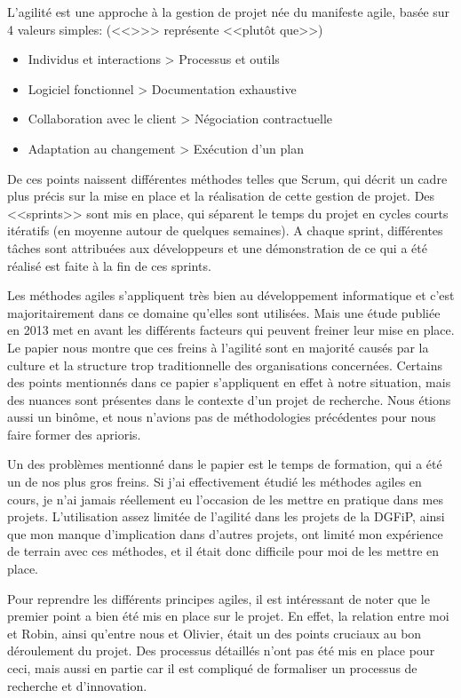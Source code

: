 \documentclass[openany, 11pt]{memoir}
\begin{document}
L'agilité est une approche à la gestion de projet née du manifeste agile, basée sur 4 valeurs simples: (<<{>}>> représente <<plutôt que>>)

\begin{itemize}
	\item Individus et interactions > Processus et outils
	\item Logiciel fonctionnel > Documentation exhaustive
	\item Collaboration avec le client > Négociation contractuelle
	\item Adaptation au changement > Exécution d'un plan
\end{itemize}

De ces points naissent différentes méthodes telles que Scrum, qui décrit un cadre plus précis sur la mise en place et la réalisation de cette gestion de projet. Des <<sprints>> sont mis en place, qui séparent le temps du projet en cycles courts itératifs (en moyenne autour de quelques semaines). A chaque sprint, différentes tâches sont attribuées aux développeurs et une démonstration de ce qui a été réalisé est faite à la fin de ces sprints.

\bigskip
Les méthodes agiles s'appliquent très bien au développement informatique et c'est majoritairement dans ce domaine qu'elles sont utilisées. Mais une étude publiée en 2013 \cite{obstacles} met en avant les différents facteurs qui peuvent freiner leur mise en place. Le papier nous montre que ces freins à l'agilité sont en majorité causés par la culture et la structure trop traditionnelle des organisations concernées. Certains des points mentionnés dans ce papier s'appliquent en effet à notre situation, mais des nuances sont présentes dans le contexte d'un projet de recherche. Nous étions aussi un binôme, et nous n'avions pas de méthodologies précédentes pour nous faire former des aprioris.

Un des problèmes mentionné dans le papier est le temps de formation, qui a été un de nos plus gros freins. Si j'ai effectivement étudié les méthodes agiles en cours, je n'ai jamais réellement eu l'occasion de les mettre en pratique dans mes projets. L'utilisation assez limitée de l'agilité dans les projets de la \gls{DGFiP}, ainsi que mon manque d'implication dans d'autres projets, ont limité mon expérience de terrain avec ces méthodes, et il était donc difficile pour moi de les mettre en place.

\bigskip
Pour reprendre les différents principes agiles, il est intéressant de noter que le premier point a bien été mis en place sur le projet. En effet, la relation entre moi et Robin, ainsi qu'entre nous et Olivier, était un des points cruciaux au bon déroulement du projet. Des processus détaillés n'ont pas été mis en place pour ceci, mais aussi en partie car il est compliqué de formaliser un processus de recherche et d'innovation.
\end{document}
